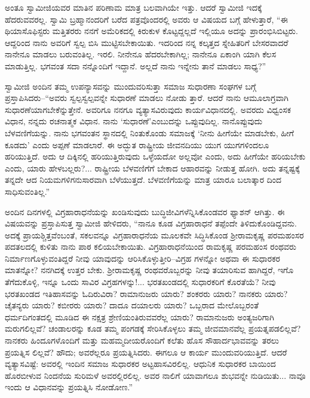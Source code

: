 ಅಂತೂ ಸ್ವಾಮೀಜಿಯವರ ಮಾತಿನ ಪರಿಣಾಮ ಮಾತ್ರ ಬಲವಾಗಿಯೇ ಇತ್ತು. ಆದರೆ ಸ್ವಾಮೀಜಿ ಇದಕ್ಕೆ ಹೆದರುವವರಲ್ಲ. ಸ್ವಾಮಿ ಬ್ರಹ್ಮಾನಂದರಿಗೆ ಬರೆದ ಪತ್ರವೊಂದರಲ್ಲಿ ಅವರು ಆ ವಿಷಯದ ಬಗ್ಗೆ ಹೇಳುತ್ತಾರೆ, “ಈ ಥಿಯಾಸೊಫಿಸ್ಟರು ಮತ್ತಿತರರು ನನಗೆ ಅಮೆರಿಕದಲ್ಲಿ ಕಿರುಕುಳ ಕೊಟ್ಟದ್ದಲ್ಲದೆ ಇಲ್ಲಿಯೂ ಅದನ್ನು ಪ್ರಾರಂಭಿಸಿಬಿಟ್ಟರು. ಆದ್ದರಿಂದ ನಾನು ಅವರಿಗೆ ಸ್ವಲ್ಪ ಬಿಸಿ ಮುಟ್ಟಿಸಬೇಕಾಯಿತು. ಇದರಿಂದ ನನ್ನ ಕಲ್ಕತ್ತದ ಸ್ನೇಹಿತರಿಗೆ ಬೇಸರವಾದರೆ ನಾನೇನೂ ಮಾಡಲು ಬರುವಂತಿಲ್ಲ. ಇರಲಿ. ನೀನೇನೂ ಹೆದರಬೇಕಾಗಿಲ್ಲ; ನಾನೇನೂ ಏಕಾಂಗಿ ಯಾಗಿ ಕೆಲಸ ಮಾಡುತ್ತಿಲ್ಲ. ಭಗವಂತ ಸದಾ ನನ್ನೊಂದಿಗೆ ಇದ್ದಾನೆ. ಅಲ್ಲದೆ ನಾನು ಇನ್ನೇನು ತಾನೆ ಮಾಡಲು ಸಾಧ್ಯ?”

ಸ್ವಾಮೀಜಿ ಅಂದಿನ ತಮ್ಮ ಉಪನ್ಯಾಸವನ್ನು ಮುಂದುವರಿಸುತ್ತಾ ಸಮಾಜ ಸುಧಾರಣಾ ಸಂಘಗಳ ಬಗ್ಗೆ ಪ್ರಸ್ತಾಪಿಸಿದರು–“ಅವರು ಸ್ವಲ್ಪಸ್ವಲ್ಪವನ್ನೇ ಸುಧಾರಣೆ ಮಾಡಲು ನೋಡು ತ್ತಾರೆ. ಆದರೆ ನಾನು ಆಮೂಲಾಗ್ರವಾಗಿ ಸುಧಾರಣೆಯಾಗಬೇಕೆನ್ನುತ್ತೇನೆ. ಅವರಿಗೂ ನನಗೂ ವ್ಯತ್ಯಾಸವಿರುವುದು ಕಾರ್ಯವಿಧಾನದಲ್ಲಿ. ಅವರದು ವಿಧ್ವಂಸಕ ವಿಧಾನ, ನನ್ನದು ರಚನಾತ್ಮಕ ವಿಧಾನ. ನಾನು ‘ಸುಧಾರಣೆ’ಎಂಬುದನ್ನು ಒಪ್ಪುವುದಿಲ್ಲ. ನಾನೊಪ್ಪುವುದು ಬೆಳವಣಿಗೆಯನ್ನು. ನಾನು ಭಗವಂತನ ಸ್ಥಾನದಲ್ಲಿ ನಿಂತುಕೊಂಡು ಸಮಾಜಕ್ಕೆ ‘ನೀನು ಹೀಗೆಯೇ ಮಾಡಬೇಕು, ಹೀಗೆ ಕೂಡದು’ ಎಂದು ಅಪ್ಪಣೆ ಮಾಡಲಾರೆ. ಈ ಅದ್ಭುತ ರಾಷ್ಟ್ರೀಯ ಜೀವನದಿಯು ಯುಗ ಯುಗಗಳಿಂದಲೂ ಹರಿಯುತ್ತಿದೆ. ಅದು ಆ ದಿಕ್ಕಿನಲ್ಲಿ ಹರಿಯುತ್ತಿರುವುದು ಒಳ್ಳೆಯದೋ ಅಲ್ಲವೋ ಎಂದು, ಅದು ಹೀಗೆಯೇ ಹರಿಯಬೇಕು ಎಂದು, ಯಾರು ಹೇಳಬಲ್ಲರು?... ರಾಷ್ಟ್ರೀಯ ಬೆಳವಣಿಗೆಗೆ ಬೇಕಾದ ಆಹಾರವನ್ನು ನೀಡುತ್ತ ಹೋಗಿ. ಅದು ತನ್ನಷ್ಟಕ್ಕೆ ತನ್ನದೇ ಆದ ನಿಯಮಗಳಿಗನುಸಾರವಾಗಿ ಬೆಳೆಯುತ್ತದೆ. ಬೆಳವಣಿಗೆಯನ್ನು ಮಾತ್ರ ಯಾರೂ ಬಲಾತ್ಕಾರ ದಿಂದ ಸಾಧಿಸುವಂತಿಲ್ಲ.”

ಅಂದಿನ ದಿನಗಳಲ್ಲಿ ವಿಗ್ರಹಾರಾಧನೆಯನ್ನು ಖಂಡಿಸುವುದು ಬುದ್ಧಿಜೀವಿಗಳೆನ್ನಿಸಿಕೊಂಡವರ ಫ್ಯಾಶನ್ ಆಗಿತ್ತು. ಈ ವಿಷಯವನ್ನು ಪ್ರಸ್ತಾಪಿಸುತ್ತ ಸ್ವಾಮೀಜಿ ಹೇಳಿದರು, “ನಾನೂ ಕೂಡ ವಿಗ್ರಹಾರಾಧನೆ ತಪ್ಪೆಂದೇ ತಿಳಿದುಕೊಂಡಿದ್ದವನು. ಅದಕ್ಕೆ ಪ್ರಾಯಶ್ಚಿತ್ತವೆಂಬಂತೆ, ಸಕಲವನ್ನೂ ವಿಗ್ರಹಾರಾಧನೆಯ ಮೂಲಕವೇ ಸಿದ್ಧಿಸಿಕೊಂಡ ಶ್ರೀರಾಮಕೃಷ್ಣ ಪರಮಹಂಸರ ಪದತಲದಲ್ಲಿ ಕುಳಿತು ನಾನು ಪಾಠ ಕಲಿಯಬೇಕಾಯಿತು. ವಿಗ್ರಹಾರಾಧನೆಯಿಂದ ರಾಮಕೃಷ್ಣ ಪರಮಹಂಸ ರಂಥವರು ನಿರ್ಮಾಣಗೊಳ್ಳುವಂತಿದ್ದರೆ ನೀವು ಯಾವುದನ್ನು ಆರಿಸಿಕೊಳ್ಳುತ್ತೀರಿ–ವಿಗ್ರಹ ಗಳನ್ನೋ ಅಥವಾ ಈ ಸುಧಾರಕರ ಮಾತನ್ನೋ? ನನಗಿದಕ್ಕೆ ಉತ್ತರ ಬೇಕು. ಶ್ರೀರಾಮಕೃಷ್ಣ ರಂಥವರೊಬ್ಬರನ್ನು ನೀವು ತಯಾರಿಸುವ ಹಾಗಿದ್ದರೆ, ಇಗೊ ತೆಗೆದುಕೊಳ್ಳಿ, ಇನ್ನೂ ಒಂದು ಸಾವಿರ ವಿಗ್ರಹಗಳನ್ನು!... ಭರತಖಂಡದಲ್ಲಿ ಸುಧಾರಕರಿಗೆ ಕೊರತೆಯೆ? ನೀವು ಭರತಖಂಡದ ಇತಿಹಾಸವನ್ನು ಓದಿರುವಿರಾ? ರಾಮಾನುಜರು ಯಾರು? ಶಂಕರರು ಯಾರು? ನಾನಕರು ಯಾರು? ಚೈತನ್ಯರು ಯಾರು? ಕಬೀರರು ಯಾರು? ದಾದೂ ದಯಾಲರು ಯಾರು? ಒಬ್ಬರಾದ ಮೇಲೊಬ್ಬರಂತೆ ಧರ್ಮದಿಗಂತದಲ್ಲಿ ಮೂಡಿದ ಈ ನಕ್ಷತ್ರ ಶ್ರೇಣಿಯಂತಿರುವವರೆಲ್ಲ ಯಾರು? ರಾಮಾನುಜರು ಅಂತ್ಯಜರಿಗಾಗಿ ಮರುಗಲಿಲ್ಲವೆ? ಚಂಡಾಲರನ್ನು ಕೂಡ ತಮ್ಮ ಪಂಗಡಕ್ಕೆ ಸೇರಿಸಿಕೊಳ್ಳಲು ತಮ್ಮ ಜೀವಮಾನವೆಲ್ಲ ಪ್ರಯತ್ನಪಡಲಿಲ್ಲವೆ? ನಾನಕರು ಹಿಂದೂಗಳೊಂದಿಗೆ ಮತ್ತು ಮಹಮ್ಮದೀಯರೊಂದಿಗೆ ಕಲೆತು ಹೊಸ ಸೌಹಾರ್ದಭಾವವನ್ನು ತರಲು ಪ್ರಯತ್ನಿಸ ಲಿಲ್ಲವೆ? ಹೌದು; ಅವರೆಲ್ಲರೂ ಪ್ರಯತ್ನಿಸಿದರು. ಈಗಲೂ ಆ ಕಾರ್ಯ ಮುಂದುವರಿಯುತ್ತಿದೆ. ಆದರೆ ವ್ಯತ್ಯಾಸವಿಷ್ಟೆ: ಅವರಲ್ಲಿ ಇಂದಿನ ಸಮಾಜ ಸುಧಾರಕರ ಅಟ್ಟಹಾಸವಿರಲಿಲ್ಲ. ಆಧುನಿಕ ಸುಧಾರಕರ ಬಾಯಿಂದ ಹೊರಬೀಳುವ ನಿಂದನೆಯ ಸುರಿಮಳೆ ಅವರಲ್ಲಿರಲಿಲ್ಲ. ಅವರ ನಾಲಿಗೆ ಯಾವಾಗಲೂ ಶುಭವನ್ನೇ ನುಡಿಯಿತು... ನಾವೂ ಇಂದು ಆ ವಿಧಾನವನ್ನು ಪ್ರಯತ್ನಿಸಿ ನೋಡೋಣ.”

